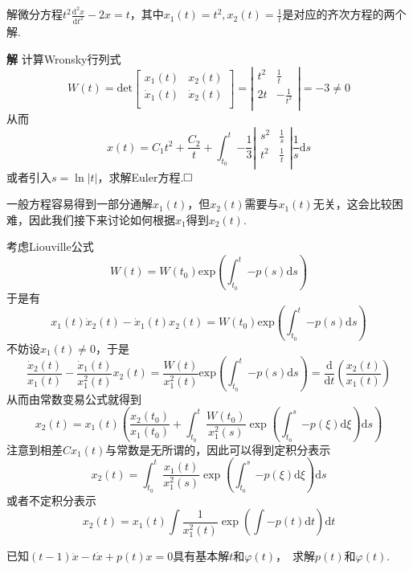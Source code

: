 \documentclass{ctexart}
\newenvironment{custom}[1]{\par\noindent \textbf{#1}\quad}{\par\vspace{1em}}
\begin{document}
\begin{example}
解微分方程$t^{2}\frac{\mathrm{d}^{2}x}{\mathrm{d}t^{2}}-2x=t$，其中$x_{1}(t)=t^{2},x_{2}(t)=\frac{1}{t}$是对应的齐次方程的两个解.
\end{example}

\begin{custom}{解}
计算Wronsky行列式
$$W(t)=\mathrm{det}\begin{bmatrix}x_{1}(t)&x_{2}(t)\\\dot{x}_{1}(t)&\dot{x}_{2}(t)\\\end{bmatrix}=\left|\begin{matrix}t^{2}&\frac{1}{t}\\2t&-\frac{1}{t^{2}}\\\end{matrix}\right|=-3\neq 0$$
从而
$$x(t)=C_{1}t^{2}+\frac{C_{2}}{t}+\int_{t_{0}}^{t}{-\frac{1}{3}\left|\begin{matrix}s^{2}&\frac{1}{s}\\t^{2}&\frac{1}{t}\\\end{matrix}\right|\frac{1}{s}\mathrm{d}s}$$
或者引入$s=\ln{|t|}$，求解Euler方程.$\hfill{\square}$
\end{custom}

一般方程容易得到一部分通解$x_{1}(t)$，但$x_{2}(t)$需要与$x_{1}(t)$无关，这会比较困难，因此我们接下来讨论如何根据$x_{1}$得到$x_{2}(t)$.

考虑Liouville公式
$$W(t)=W(t_{0})\mathrm{exp}\left(\int_{t_{0}}^{t}{-p(s)\mathrm{d}s}\right)$$
于是有
$$x_{1}(t)\dot{x}_{2}(t)-\dot{x}_{1}(t)x_{2}(t)=W(t_{0})\mathrm{exp}\left(\int_{t_{0}}^{t}{-p(s)\mathrm{d}s}\right)$$
不妨设$x_{1}(t)\neq 0$，于是
$$\frac{\dot{x}_{2}(t)}{x_{1}(t)}-\frac{\dot{x}_{1}(t)}{x_{1}^{2}(t)}x_{2}(t)=\frac{W(t)}{x_{1}^{2}(t)}\mathrm{exp}\left(\int_{t_{0}}^{t}{-p(s)\mathrm{d}s}\right)=\frac{\mathrm{d}}{\mathrm{d}t}\left(\frac{x_{2}(t)}{x_{1}(t)}\right)$$
从而由常数变易公式就得到
$$x_{2}(t)=x_{1}(t)\left(\frac{x_{2}(t_{0})}{x_{1}(t_{0})}+\int_{t_{0}}^{t}{\frac{W(t_{0})}{x_{1}^{2}(s)}\exp{\left(\int_{t_{0}}^{s}{-p(\xi)\mathrm{d}\xi}\right)}\mathrm{d}s}\right)$$
注意到相差$Cx_{1}(t)$与常数是无所谓的，因此可以得到定积分表示
$$x_{2}(t)=\int_{t_{0}}^{t}{\frac{x_{1}(t)}{x_{1}^{2}(s)}\exp{\left(\int_{t_{0}}^{s}{-p(\xi)\mathrm{d}\xi}\right)}\mathrm{d}s}$$
或者不定积分表示
$$x_{2}(t)=x_{1}(t)\int{\frac{1}{x_{1}^{2}(t)}\exp{\left(\int{-p(t)\mathrm{d}t}\right)}\mathrm{d}t}$$
\begin{example}
已知$(t-1)\ddot{x}-t\dot{x}+p(t)x=0$具有基本解$t$和$\varphi(t)$，~求解$p(t)$和$\varphi(t)$.
\end{example}
\end{document}
